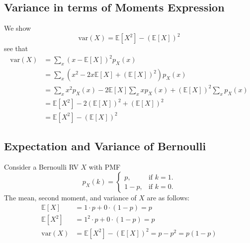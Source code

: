 \documentclass{report}
\begin{document}
\subsection{Variance in terms of Moments Expression}
We show
\begin{equation*}
\boxed{\text{var}(X)=\mathbb{E}[X^2]-(\mathbb{E}[X])^2}
\end{equation*}
see that
\begin{align*}
\text{var}(X)&=\sum_x(x-\mathbb{E}[X])^2p_X(x)\\
&=\sum_x(x^2-2x\mathbb{E}[X]+(\mathbb{E}[X])^2)p_X(x)\\
&=\sum_xx^2p_X(x)-2\mathbb{E}[X]\sum_xxp_X(x)+(\mathbb{E}[X])^2\sum_xp_X(x)\\
&=\mathbb{E}[X^2]-2(\mathbb{E}[X])^2+(\mathbb{E}[X])^2\\
&=\mathbb{E}[X^2]-(\mathbb{E}[X])^2
\end{align*}
\newpage

\subsection{Expectation and Variance of Bernoulli}
Consider a Bernoulli RV $X$ with PMF
\begin{equation*}
p_X(k)=\begin{cases}
p,&\text{if }k=1.\\
1-p,&\text{if }k=0.
\end{cases}
\end{equation*}
The mean, second moment, and variance of $X$ are as follows:
\begin{align*}
\mathbb{E}[X]&=1\cdot p+0\cdot(1-p)=p\\
\mathbb{E}[X^2]&=1^2\cdot p+0\cdot(1-p)=p\\
\text{var}(X)&=\mathbb{E}[X^2]-(\mathbb{E}[X])^2
=p-p^2=p(1-p)
\end{align*}
\end{document}
